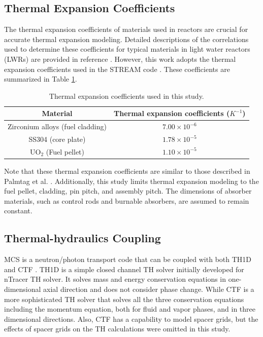 \subsection{Thermal Expansion Coefficients} \label{sec32}

The thermal expansion coefficients of materials used in reactors are crucial for accurate thermal expansion modeling. Detailed descriptions of the correlations used to determine these coefficients for typical materials in light water reactors (LWRs) are provided in reference \cite{palmtag}. However, this work adopts the thermal expansion coefficients used in the STREAM code \cite{choi_2021}. These coefficients are summarized in Table \ref{tab1}.
\begin{table}
    \centering
    \caption{Thermal expansion coefficients used in this study.}
    \label{tab1} 
   \begin{adjustbox}{width=0.72\textwidth} %
    \begin{tabular}{| c | c | }
    \hline 
     Material & Thermal expansion coefficients ($K^{-1}$) \\
     \hline
     Zirconium alloys (fuel cladding)     & $7.00\times10^{-6}$      \\ \hline
     SS304 (core plate)                   & $1.78\times10^{-5}$      \\ \hline
     UO$_2$ (Fuel pellet)                 & $1.10\times10^{-5}$      \\ \hline
    \end{tabular}
    \end{adjustbox}
\end{table}

Note that these thermal expansion coefficients are similar to those described in Palmtag et al. \cite{palmtag}. Additionally, this study limits thermal expansion modeling to the fuel pellet, cladding, pin pitch, and assembly pitch. The dimensions of absorber materials, such as control rods and burnable absorbers, are assumed to remain constant.

\subsection{Thermal-hydraulics Coupling} \label{sec33a}

MCS is a neutron/photon transport code that can be coupled with both TH1D \cite{ryu_2015} and CTF \cite{salko}. TH1D is a simple closed channel TH solver initially developed for nTracer TH solver. It solves mass and energy conservation equations in one-dimensional axial direction and does not consider phase change. While CTF is a more sophisticated TH solver that solves all the three conservation equations including the momentum equation, both for fluid and vapor phases, and in three dimensional directions. Also, CTF has a capability to model spacer grids, but the effects of spacer grids on the TH calculations were omitted in this study.


